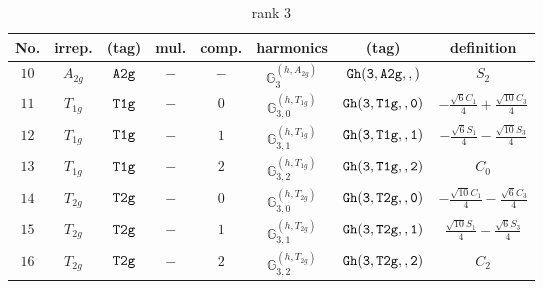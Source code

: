 \documentclass[fleqn,8pt]{jsarticle}
\begin{document}
\begin{table}[ht!]
\begin{center}
\caption{rank 3}
\renewcommand{\arraystretch}{1.3}
\begin{tabular}{cccccccc} \hline \hline
No. & irrep. & (tag) & mul. & comp. & harmonics & (tag) & definition \\ \hline
$ 10 $ & $ A_{2g} $ & $ {\tt A2g} $ & $ - $ & $ - $ & $ \mathbb{G}_{3}^{(h,A_{2g})} $ & $ {\tt Gh(3,A2g,,)} $ & $ S_{2} $ \\
$ 11 $ & $ T_{1g} $ & $ {\tt T1g} $ & $ - $ & $ 0 $ & $ \mathbb{G}_{3,0}^{(h,T_{1g})} $ & $ {\tt Gh(3,T1g,,0)} $ & $ - \frac{\sqrt{6} C_{1}}{4} + \frac{\sqrt{10} C_{3}}{4} $ \\
$ 12 $ & $ T_{1g} $ & $ {\tt T1g} $ & $ - $ & $ 1 $ & $ \mathbb{G}_{3,1}^{(h,T_{1g})} $ & $ {\tt Gh(3,T1g,,1)} $ & $ - \frac{\sqrt{6} S_{1}}{4} - \frac{\sqrt{10} S_{3}}{4} $ \\
$ 13 $ & $ T_{1g} $ & $ {\tt T1g} $ & $ - $ & $ 2 $ & $ \mathbb{G}_{3,2}^{(h,T_{1g})} $ & $ {\tt Gh(3,T1g,,2)} $ & $ C_{0} $ \\
$ 14 $ & $ T_{2g} $ & $ {\tt T2g} $ & $ - $ & $ 0 $ & $ \mathbb{G}_{3,0}^{(h,T_{2g})} $ & $ {\tt Gh(3,T2g,,0)} $ & $ - \frac{\sqrt{10} C_{1}}{4} - \frac{\sqrt{6} C_{3}}{4} $ \\
$ 15 $ & $ T_{2g} $ & $ {\tt T2g} $ & $ - $ & $ 1 $ & $ \mathbb{G}_{3,1}^{(h,T_{2g})} $ & $ {\tt Gh(3,T2g,,1)} $ & $ \frac{\sqrt{10} S_{1}}{4} - \frac{\sqrt{6} S_{3}}{4} $ \\
$ 16 $ & $ T_{2g} $ & $ {\tt T2g} $ & $ - $ & $ 2 $ & $ \mathbb{G}_{3,2}^{(h,T_{2g})} $ & $ {\tt Gh(3,T2g,,2)} $ & $ C_{2} $ \\
 \hline \hline
\end{tabular}
\end{center}
\end{table}
\end{document}
